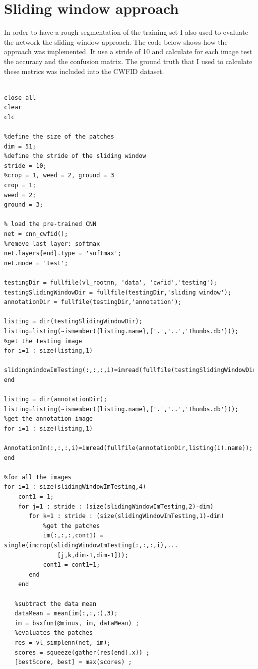 \documentclass[]{report}
\begin{document}
\newpage
\section{Sliding window approach}

In order to have a rough segmentation of the training set I also used to evaluate the network the sliding window approach. The code below shows how the approach was implemented. It use a stride of 10 and calculate for each image test the accuracy and the confusion matrix. The ground truth that I used to calculate these metrics was included into the CWFID dataset.  

\begin{lstlisting}

close all
clear
clc

%define the size of the patches
dim = 51;
%define the stride of the sliding window
stride = 10;
%crop = 1, weed = 2, ground = 3
crop = 1;
weed = 2;
ground = 3;

% load the pre-trained CNN
net = cnn_cwfid();
%remove last layer: softmax  
net.layers{end}.type = 'softmax';
net.mode = 'test';

testingDir = fullfile(vl_rootnn, 'data', 'cwfid','testing');
testingSlidingWindowDir = fullfile(testingDir,'sliding window');
annotationDir = fullfile(testingDir,'annotation');

listing = dir(testingSlidingWindowDir);
listing=listing(~ismember({listing.name},{'.','..','Thumbs.db'}));
%get the testing image
for i=1 : size(listing,1)
    slidingWindowImTesting(:,:,:,i)=imread(fullfile(testingSlidingWindowDir,listing(i).name));
end

listing = dir(annotationDir);
listing=listing(~ismember({listing.name},{'.','..','Thumbs.db'}));
%get the annotation image
for i=1 : size(listing,1)
    AnnotationIm(:,:,:,i)=imread(fullfile(annotationDir,listing(i).name));
end

%for all the images
for i=1 : size(slidingWindowImTesting,4)
    cont1 = 1;
    for j=1 : stride : (size(slidingWindowImTesting,2)-dim)
       for k=1 : stride : (size(slidingWindowImTesting,1)-dim)
           %get the patches
           im(:,:,:,cont1) = single(imcrop(slidingWindowImTesting(:,:,:,i),...
               [j,k,dim-1,dim-1]));
           cont1 = cont1+1;
       end
    end
    
   %subtract the data mean 
   dataMean = mean(im(:,:,:),3);
   im = bsxfun(@minus, im, dataMean) ;
   %evaluates the patches    
   res = vl_simplenn(net, im);
   scores = squeeze(gather(res(end).x)) ;
   [bestScore, best] = max(scores) ;


\end{lstlisting}
\end{document}

